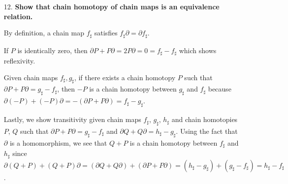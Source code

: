 \documentclass[a4paper,12pt]{article}
\begin{document}
\begin{enumerate}
    \item[12.]
        \boldmath\textbf{Show that chain homotopy of chain maps is an equivalence relation.
        }\unboldmath \par
        By definition, a chain map $f_\sharp$ satisfies $f_\sharp \partial = \partial f_\sharp$. \par
        If $P$ is identically zero, then $\partial P + P \partial = 2P \partial = 0 = f_\sharp - f_\sharp$ which shows reflexivity. \par
        Given chain maps $f_\sharp, g_\sharp$, if there exists a chain homotopy $P$ such that $\partial P + P \partial = g_\sharp - f_\sharp$, then $-P$ is a chain homotopy between $g_\sharp$ and $f_\sharp$ because $\partial(-P) + (-P)\partial = -(\partial P + P\partial) = f_\sharp - g_\sharp$. \par
        Lastly, we show transitivity given chain maps $f_\sharp$, $g_\sharp$, $h_\sharp$ and chain homotopies $P$, $Q$ such that $\partial P + P \partial = g_\sharp - f_\sharp$ and $\partial Q + Q \partial = h_\sharp - g_\sharp$. Using the fact that $\partial$ is a homomorphism, we see that $Q + P$ is a chain homotopy between $f_\sharp$ and $h_\sharp$ since $\partial(Q + P) + (Q + P)\partial = (\partial Q + Q \partial) + (\partial P + P \partial) = (h_\sharp - g_\sharp) + (g_\sharp - f_\sharp) = h_\sharp - f_\sharp$.
\end{enumerate}
\end{document}
